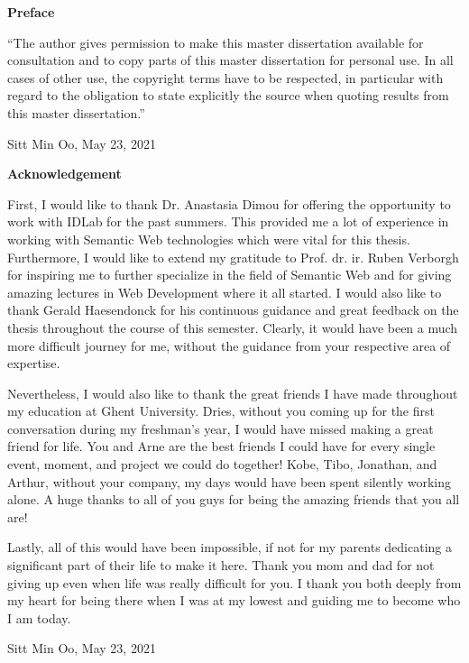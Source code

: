 
\newpage
{}
{}
\noindent \textbf{\huge Preface}

\vspace{1.5cm}

\noindent
``The author gives permission to make this master dissertation available for consultation and to copy parts
of this master dissertation for personal use. In all cases of other use, the copyright terms have to be respected,
in particular with regard to the obligation to state explicitly the source when quoting results from this master
dissertation.''

\vspace{1cm}

\noindent Sitt Min Oo, May 23, 2021 


\newpage
{}
{}
\noindent \textbf{\huge Acknowledgement}

\vspace{1.5cm}
First, I would like to thank Dr. Anastasia Dimou for offering the opportunity to 
work with IDLab for the past summers. This provided me a lot of experience 
in working with Semantic Web technologies which were vital for this 
thesis. Furthermore, I would like to extend my gratitude to Prof. dr. ir. Ruben Verborgh 
for inspiring me to further specialize in the field of Semantic Web and for giving amazing 
lectures in Web Development where it all started. I would also like to thank Gerald Haesendonck for 
his continuous guidance and great feedback on the thesis throughout the course of this semester. 
Clearly, it would have been a much more difficult journey for me, without the guidance from your 
respective area of expertise.

Nevertheless, I would also like to thank the great friends I have made throughout my education 
at Ghent University. Dries, without you coming up for the first conversation during my freshman's year, I would 
have missed making a great friend for life. You and Arne are the best friends I could have for every single 
event, moment, and project we could do together! Kobe, Tibo, Jonathan, and Arthur, without your company,  
my days would have been spent silently working alone. 
A huge thanks to all of you guys for being the amazing friends that you all are!  

Lastly, all of this would have been impossible, if not for my parents dedicating a significant part of 
their life to make it here. Thank you mom and dad for not giving up even when life was really difficult 
for you. 
I thank you both deeply from my heart for being there when I was at my lowest and guiding me to become 
who I am today. 

\vspace{1cm}
\noindent Sitt Min Oo, May 23, 2021 
